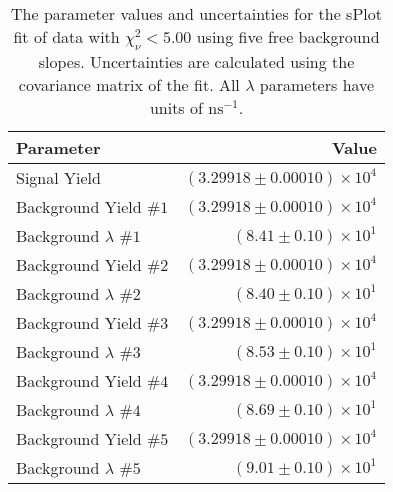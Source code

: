 
\begin{table}[ht]
    \begin{center}
        \begin{tabular}{lr}\toprule
            Parameter & Value \\\midrule
            Signal Yield & $(3.29918 \pm 0.00010) \times 10^{4}$ \\
            Background Yield $\#1$ & $(3.29918 \pm 0.00010) \times 10^{4}$ \\
            Background $\lambda$ $\#1$ & $(8.41 \pm 0.10) \times 10^{1}$ \\
            Background Yield $\#2$ & $(3.29918 \pm 0.00010) \times 10^{4}$ \\
            Background $\lambda$ $\#2$ & $(8.40 \pm 0.10) \times 10^{1}$ \\
            Background Yield $\#3$ & $(3.29918 \pm 0.00010) \times 10^{4}$ \\
            Background $\lambda$ $\#3$ & $(8.53 \pm 0.10) \times 10^{1}$ \\
            Background Yield $\#4$ & $(3.29918 \pm 0.00010) \times 10^{4}$ \\
            Background $\lambda$ $\#4$ & $(8.69 \pm 0.10) \times 10^{1}$ \\
            Background Yield $\#5$ & $(3.29918 \pm 0.00010) \times 10^{4}$ \\
            Background $\lambda$ $\#5$ & $(9.01 \pm 0.10) \times 10^{1}$ \\\bottomrule
        \end{tabular}
        \caption{The parameter values and uncertainties for the sPlot fit of data with $\chi^2_\nu < 5.00$ using five free background slopes. Uncertainties are calculated using the covariance matrix of the fit. All $\lambda$ parameters have units of $\si{\nano\second}^{-1}$.}\label{tab:splot-fit-results-chisqdof-5.00-free-5}
    \end{center}
\end{table}

